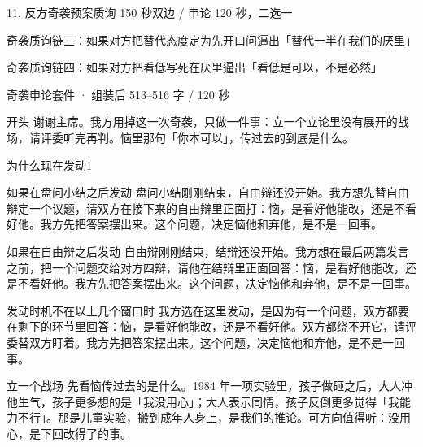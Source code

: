 \documentclass[script,con]{debate}
\begin{document}
\begin{stage}{11. 反方奇袭预案}{质询 150 秒双边 / 申论 120 秒，二选一}
\begin{chain}{奇袭质询链三：如果对方把替代态度定为先开口问}{逼出「替代一半在我们的厌里」}
\end{chain}
\begin{chain}{奇袭质询链四：如果对方把看低写死在厌里}{逼出「看低是可以，不是必然」}
\end{chain}

\begin{kit}{奇袭申论}{套件 · 组装后 513–516 字 / 120 秒}
\begin{fixed}{开头}
谢谢主席。我方用掉这一次奇袭，只做一件事：立一个立论里没有展开的战场，请评委听完再判。恼里那句「你本可以」，传过去的到底是什么。
\end{fixed}
\begin{pick}{为什么现在发动}{1}
\begin{module}{如果在盘问小结之后发动}
盘问小结刚刚结束，自由辩还没开始。我方想先替自由辩定一个议题，请双方在接下来的自由辩里正面打：恼，是看好他能改，还是不看好他。我方先把答案摆出来。这个问题，决定恼他和弃他，是不是一回事。
\end{module}
\begin{module}{如果在自由辩之后发动}
自由辩刚刚结束，结辩还没开始。我方想在最后两篇发言之前，把一个问题交给对方四辩，请他在结辩里正面回答：恼，是看好他能改，还是不看好他。我方先把答案摆出来。这个问题，决定恼他和弃他，是不是一回事。
\end{module}
\begin{fallback}{发动时机不在以上几个窗口时}
我方选在这里发动，是因为有一个问题，双方都要在剩下的环节里回答：恼，是看好他能改，还是不看好他。双方都绕不开它，请评委替双方盯着。我方先把答案摆出来。这个问题，决定恼他和弃他，是不是一回事。
\end{fallback}
\end{pick}
\begin{fixed}{立一个战场}
先看恼传过去的是什么。1984 年一项实验里，孩子做砸之后，大人冲他生气，孩子更多想的是「我没用心」；大人表示同情，孩子反倒更多觉得「我能力不行」。那是儿童实验，搬到成年人身上，是我们的推论。可方向值得听：没用心，是下回改得了的事。


\end{fixed}
\end{kit}
\end{stage}
\end{document}
